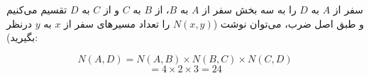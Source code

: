 سفر از
$A$
به
$D$
را به سه بخش سفر از
$A$
به
$B$،
از
$B$
به
$C$
و از
$C$
به
$D$
تقسیم می‌کنیم و طبق اصل ضرب، می‌توان نوشت
($N(x,y)$ را تعداد مسیر‌های سفر از $x$ به $y$ درنظر بگیرید):

$$N(A,D) = N(A,B) \times N(B,C) \times N(C,D)$$
$$= 4 \times 2 \times 3 = 24$$